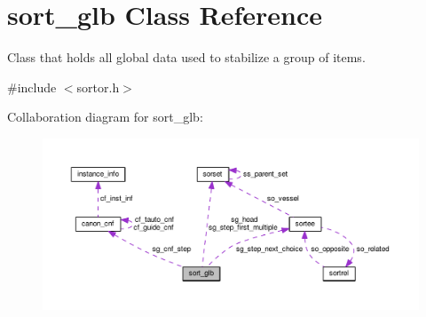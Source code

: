 \hypertarget{classsort__glb}{\section{sort\+\_\+glb Class Reference}
\label{classsort__glb}
}


Class that holds all global data used to stabilize a group of items.  




{\ttfamily \#include $<$sortor.\+h$>$}



Collaboration diagram for sort\+\_\+glb\+:\nopagebreak
\begin{figure}[H]
\begin{center}
\leavevmode
\includegraphics[width=350pt]{d8/d20/classsort__glb__coll__graph}
\end{center}
\end{figure}
